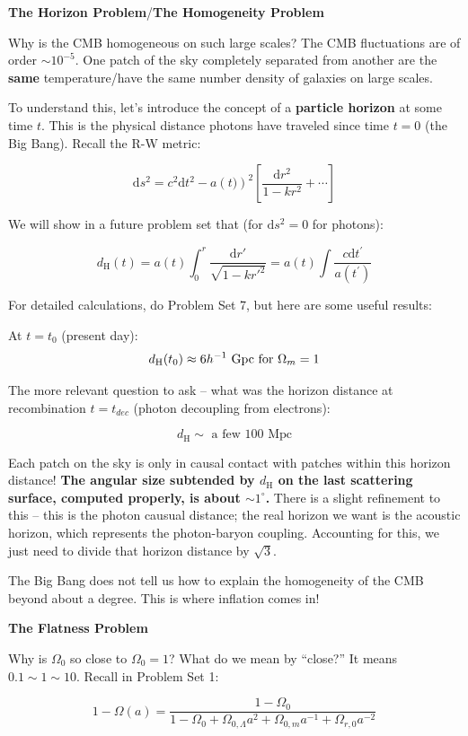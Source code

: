 \documentclass{article}
\newcommand{\unit}[1]{{\,\rm #1}}
\newcommand{\be}{\begin{equation}}
\newcommand{\ee}{\end{equation}}
\begin{document}
\noindent\textbf{The Horizon Problem}/\textbf{The Homogeneity Problem}


Why is the CMB homogeneous on such large scales? The CMB fluctuations are of order $\sim 10^{-5}$. One patch of the sky completely separated from another are the \textbf{same} temperature/have the same number density of galaxies on large scales. 

To understand this, let's introduce the concept of a \textbf{particle horizon} at some time $t$. This is the physical distance photons have traveled since time $t=0$ (the Big Bang). Recall the R-W metric:

\be
\mathrm{d}s^2 = c^2 \mathrm{d}t^2 - a\left(t)\right)^2 \left[\frac{\mathrm{d}r^2}{1-kr^2}+ \cdots \right]
\ee

We will show in a future problem set that (for $\mathrm{d}s^2 = 0$ for photons):

\be
d_\text{H}(t) = a\left(t\right) \int_0^{r} \frac{\mathrm{d}r\prime}{\sqrt{1-kr\prime^2}} = a(t) \int \frac{c \mathrm{d}t^\prime}{a(t^\prime)}
\ee

For detailed calculations, do Problem Set 7, but here are some useful results:


At $t=t_0$ (present day):
\be
d_\text{H}(t_0)\approx 6 h^{-1}\, \unit{Gpc} \text{ for } \Omega_m = 1
\ee

The more relevant question to ask -- what was the horizon distance at recombination $t = t_{dec}$ (photon decoupling from electrons):

\be
d_\text{H} \sim \text{ a few } 100 \text{ Mpc}
\ee

Each patch on the sky is only in causal contact with patches within this horizon distance! \textbf{The angular size subtended by $d_\text{H}$ on the last scattering surface, computed properly, is about $\sim 1^\circ$. } There is a slight refinement to this -- this is the photon causual distance; the real horizon we want is the acoustic horizon, which represents the photon-baryon coupling. Accounting for this, we just need to divide that horizon distance by $\sqrt{3}$.

The Big Bang does not tell us how to explain the homogeneity of the CMB beyond about a degree. This is where inflation comes in!  

\noindent\textbf{The Flatness Problem}

Why is $\Omega_{0}$ so close to $\Omega_0 = 1$? What do we mean by ``close?'' It means $0.1 \sim 1 \sim 10$. Recall in Problem Set 1:

\be
1 - \Omega(a) = \frac{1 - \Omega_0}{1 - \Omega_0 + \Omega_{0,\Lambda}a^2 + \Omega_{0,m} a^{-1} + \Omega_{r,0} a^{-2} }
\ee
\end{document}
